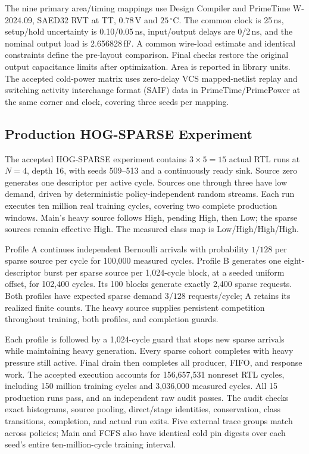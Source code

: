 The nine primary area/timing mappings use Design Compiler and PrimeTime
W-2024.09, SAED32 RVT at TT, 0.78\,V and $25\,{}^\circ$C. The common clock is
25\,ns, setup/hold uncertainty is 0.10/0.05\,ns, input/output delays are
0/2\,ns, and the nominal output load is 2.656828\,fF. A common wire-load
estimate and identical constraints define the pre-layout comparison. Final
checks restore the original output capacitance limits after optimization.
Area is reported in library units. The accepted cold-power matrix uses
zero-delay VCS mapped-netlist replay and switching activity interchange format
(SAIF) data in PrimeTime/PrimePower
at the same corner and clock, covering three seeds per mapping.

\subsection{Production HOG-SPARSE Experiment}
The accepted HOG-SPARSE experiment contains $3\times5=15$ actual RTL runs at
$N=4$, depth 16, with seeds 509--513 and a continuously ready sink. Source zero
generates one descriptor per active cycle. Sources one through three have
low demand, driven by deterministic policy-independent random streams.
Each run executes ten million real training cycles, covering two complete
production windows. Main's heavy source follows High, pending High, then Low;
the sparse sources remain effective High. The measured class map is
Low/High/High/High.

Profile A continues independent Bernoulli arrivals with probability $1/128$
per sparse source per cycle for 100,000 measured cycles. Profile B generates
one eight-descriptor burst per sparse source per 1,024-cycle block, at a seeded
uniform offset, for 102,400 cycles. Its 100 blocks generate exactly 2,400 sparse
requests. Both profiles have expected sparse demand $3/128$ requests/cycle;
A retains its realized finite counts. The heavy source supplies persistent
competition throughout training, both profiles, and completion guards.

Each profile is followed by a 1,024-cycle guard that stops new sparse arrivals
while maintaining heavy generation. Every sparse cohort completes with heavy
pressure still active. Final drain then completes all producer, FIFO, and
response work. The accepted execution accounts for 156,657,531 nonreset RTL
cycles, including 150 million training cycles and 3,036,000 measured cycles.
All 15 production runs pass, and an independent raw audit passes. The audit
checks exact histograms, source pooling, direct/stage identities, conservation,
class transitions, completion, and actual run exits. Five external trace groups
match across policies; Main and FCFS also have identical cold pin digests over
each seed's entire ten-million-cycle training interval.

